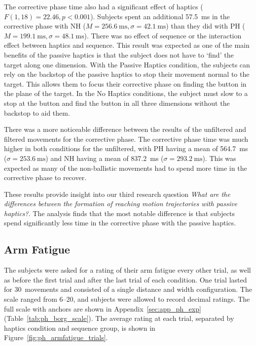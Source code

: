 The corrective phase time also had a significant effect of haptics ($F(1, 18)=22.46, p<0.001$).
Subjects spent an additional \SI{57.5}{\milli\second} in the corrective phase with NH ($M=\SI{256.6}{\milli\second}, \sigma=\SI{42.1}{\milli\second}$) than they did with PH ($M=\SI{199.1}{\milli\second}, \sigma=\SI{48.1}{\milli\second}$).
There was no effect of sequence or the interaction effect between haptics and sequence.
This result was expected as one of the main benefits of the passive haptics is that the subject does not have to `find' the target along one dimension.
With the Passive Haptics condition, the subjects can rely on the backstop of the passive haptics to stop their movement normal to the target.
This allows them to focus their corrective phase on finding the button in the plane of the target.
In the No Haptics conditions, the subject must slow to a stop at the button and find the button in all three dimensions without the backstop to aid them.

There was a more noticeable difference between the results of the unfiltered and filtered movements for the corrective phase.
The corrective phase time was much higher in both conditions for the unfiltered, with PH having a mean of \SI{564.7}{\milli\second} ($\sigma=\SI{253.6}{\milli\second}$) and NH having a mean of \SI{837.2}{\milli\second} ($\sigma=\SI{293.2}{\milli\second}$).
This was expected as many of the non-ballistic movements had to spend more time in the corrective phase to recover.

These results provide insight into our third research question \textit{What are the differences between the formation of reaching motion trajectories with passive haptics?}.
The analysis finds that the most notable difference is that subjects spend significantly less time in the corrective phase with the passive haptics.

\subsection{Arm Fatigue}

The subjects were asked for a rating of their arm fatigue every other trial, as well as before the first trial and after the last trial of each condition.
One trial lasted for 30~movements and consisted of a single distance and width configuration.
The scale ranged from \numrange{6}{20}, and subjects were allowed to record decimal ratings.
The full scale with anchors are shown in Appendix~\ref{sec:app_ph_exp} (Table~\ref{tab:ph_borg_scale}).
The average rating at each trial, separated by haptics condition and sequence group, is shown in Figure~\ref{fig:ph_armfatigue_trials}.

